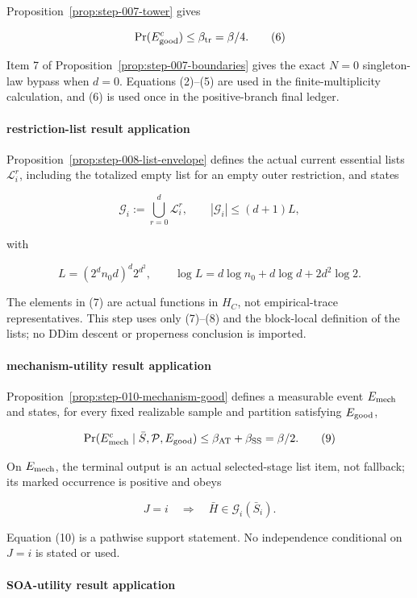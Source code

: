 Proposition~\ref{prop:step-007-tower} gives

\[
 \Pr(E_{\rm good}^c)\leq\beta_{\rm tr}=\beta/4.
 \tag{6}
\]

Item 7 of Proposition~\ref{prop:step-007-boundaries} gives the
exact \(N=0\) singleton-law bypass when \(d=0\). Equations (2)--(5) are
used in the finite-multiplicity calculation, and (6) is used once in the
positive-branch final ledger.

\paragraph{restriction-list result application}

Proposition~\ref{prop:step-008-list-envelope} defines the actual
current essential lists \(\mathcal L_i^r\), including the totalized empty
list for an empty outer restriction, and states

\[
 \mathcal G_i:=\bigcup_{r=0}^d\mathcal L_i^r,
 \qquad
 |\mathcal G_i|\leq(d+1)L,
 \tag{7}
\]

with

\[
 L=(2^dn_0d)^d2^{d^2},
 \qquad
 \log L=d\log n_0+d\log d+2d^2\log2.
 \tag{8}
\]

The elements in (7) are actual functions in \(H_C\), not empirical-trace
representatives. This step uses only (7)--(8) and the block-local definition
of the lists; no DDim descent or properness conclusion is imported.

\paragraph{mechanism-utility result application}

Proposition~\ref{prop:step-010-mechanism-good} defines a measurable
event \(E_{\rm mech}\) and states, for every fixed realizable sample and
partition satisfying \(E_{\rm good}\),

\[
 \Pr(E_{\rm mech}^c\mid\bar S,\mathcal P,E_{\rm good})
 \leq\beta_{\rm AT}+\beta_{\rm SS}=\beta/2.
 \tag{9}
\]

On \(E_{\rm mech}\), the terminal output is an actual selected-stage list
item, not fallback; its  marked occurrence is positive and obeys

\[
 J=i\quad\Longrightarrow\quad
 \bar H\in\mathcal G_i(\bar S_i).
 \tag{10}
\]

Equation (10) is a pathwise support statement. No independence conditional
on \(J=i\) is stated or used.

\paragraph{SOA-utility result application}

